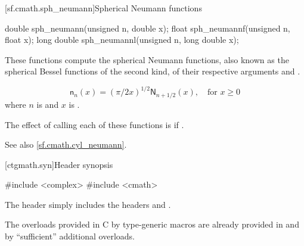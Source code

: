 [sf.cmath.sph_neumann]{Spherical Neumann functions}%
%
%
%
%
%
%
\begin{itemdecl}
double       sph_neumann(unsigned n, double x);
float        sph_neumannf(unsigned n, float x);
long double  sph_neumannl(unsigned n, long double x);
\end{itemdecl}

\begin{itemdescr}

\pnum\effects
These functions compute the spherical Neumann functions,
also known as the spherical Bessel functions of the second kind,
of their respective arguments
 and .

\pnum\returns
\[%
  \mathsf{n}_n(x) =
  (\pi/2x)^{1\!/\!2} \mathsf{N}_{n + 1\!/\!2}(x),
	   \quad \mbox{for $x \ge 0$}
\]
where
$n$ is  and
$x$ is .

\pnum\remarks
The effect of calling each of these functions
is 
if .

\pnum See also \ref{sf.cmath.cyl_neumann}.
\end{itemdescr}


[ctgmath.syn]{Header  synopsis}

%
\begin{codeblock}
#include <complex>
#include <cmath>
\end{codeblock}

\pnum
The header  simply includes the headers 
and .

\pnum
\begin{note} The overloads provided in C by type-generic macros are already
provided in  and  by ``sufficient'' additional
overloads.\end{note}
